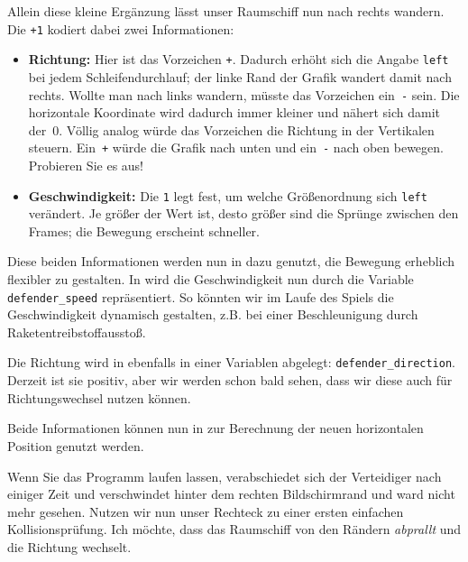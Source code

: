 Allein diese kleine Ergänzung lässt unser Raumschiff nun nach rechts wandern. Die \texttt{+1} kodiert dabei zwei Informationen: 
\begin{itemize}
	\item \textbf{Richtung:} Hier ist das Vorzeichen \texttt{+}. Dadurch erhöht sich die Angabe \texttt{left} bei jedem Schleifendurchlauf; der linke Rand der Grafik wandert damit nach rechts. Wollte man nach links wandern, müsste das Vorzeichen ein~\texttt{-} sein. Die horizontale Koordinate wird dadurch immer kleiner und nähert sich damit der~0. Völlig analog würde das Vorzeichen die Richtung in der Vertikalen steuern. Ein~\texttt{+} würde die Grafik nach unten und ein~\texttt{-} nach oben bewegen. Probieren Sie es aus!
	
	\item \textbf{Geschwindigkeit:} Die \texttt{1} legt fest, um welche Größenordnung sich \texttt{left} verändert. Je größer der Wert ist, desto größer sind die Sprünge zwischen den Frames; die Bewegung erscheint schneller. 
\end{itemize}


Diese beiden Informationen werden nun in  dazu genutzt, die Bewegung erheblich flexibler zu gestalten. In  wird die Geschwindigkeit nun durch die Variable \texttt{defender\_speed} repräsentiert. So könnten wir im Laufe des Spiels die Geschwindigkeit dynamisch gestalten, z.B. bei einer Beschleunigung durch Raketentreibstoffausstoß.

Die Richtung wird in  ebenfalls in einer Variablen abgelegt: \texttt{defender\_direction}. Derzeit ist sie positiv, aber wir werden schon bald sehen, dass wir diese auch für Richtungswechsel nutzen können.

Beide Informationen können nun in  zur Berechnung der neuen horizontalen Position genutzt werden.

Wenn Sie das Programm laufen lassen, verabschiedet sich der Verteidiger nach einiger Zeit und verschwindet hinter dem rechten Bildschirmrand und ward nicht mehr gesehen. Nutzen wir nun unser Rechteck zu einer ersten einfachen Kollisionsprüfung. Ich möchte, dass das Raumschiff von den Rändern \emph{abprallt} und die Richtung wechselt. 

